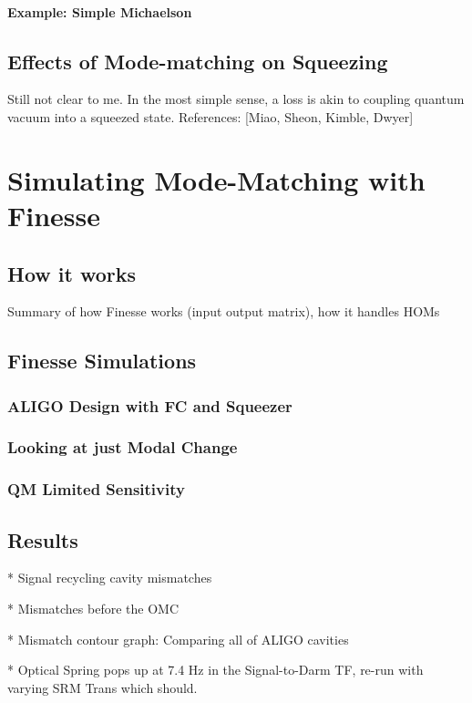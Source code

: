 \documentclass[oneside]{book}
\begin{document}
		
		\subsubsection{Example: Simple Michaelson}
		


		\section{Effects of Mode-matching on Squeezing}
		Still not clear to me.
		In the most simple sense, a loss is akin to coupling quantum vacuum into a squeezed state.
		References: [Miao, Sheon, Kimble, Dwyer]
	
	
\chapter{Simulating Mode-Matching with Finesse}	
	\section{How it works}
	Summary of how Finesse works (input output matrix), how it handles HOMs
	\section{Finesse Simulations}
		\subsection{ALIGO Design with FC and Squeezer}
		\subsection{Looking at just Modal Change}
		\subsection{QM Limited Sensitivity}
			
	\section{Results}
		* Signal recycling cavity mismatches

		* Mismatches before the OMC
			
		* Mismatch contour graph: Comparing all of ALIGO cavities
		
		* Optical Spring pops up at 7.4 Hz in the Signal-to-Darm TF, re-run with varying SRM Trans which should.
\end{document}
